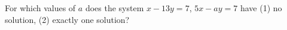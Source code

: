 For which values of $a$ does the system $x-13y=7$, $5x-ay=7$ have (1) no solution, (2) exactly one solution?
